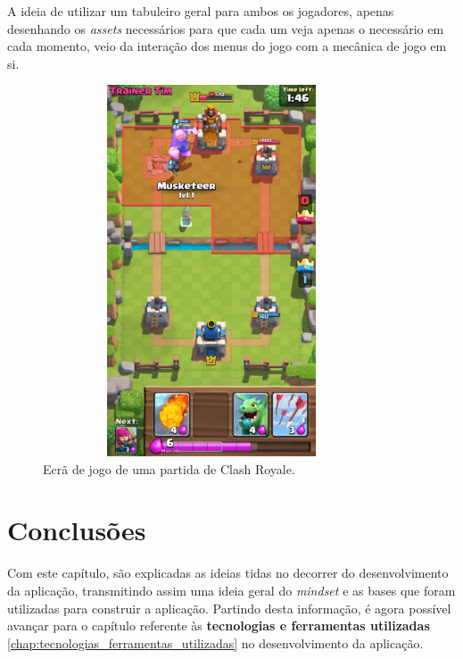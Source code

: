 \begin{enumerate}
    A ideia de utilizar um tabuleiro geral para ambos os jogadores, apenas desenhando os \textit{assets} necessários para que cada um veja apenas o necessário em cada momento, veio da interação dos menus do jogo com a mecânica de jogo em si.

\begin{figure}[!h]
  \includegraphics[width=10cm, height=11cm]{clash-royale-4.jpg}
  \centering
  \caption{Ecrã de jogo de uma partida de Clash Royale.}
  \label{fig:clash}
\end{figure}

\end{enumerate}



\clearpage
\section{Conclusões}
\label{chap2:sec:conc}
Com este capítulo, são explicadas as ideias tidas no decorrer do desenvolvimento da aplicação, transmitindo assim uma ideia geral do \textit{mindset} e as bases que foram utilizadas para construir a aplicação. Partindo desta informação, é agora possível avançar para o capítulo referente às \textbf{tecnologias e ferramentas utilizadas} \autoref{chap:tecnologias_ferramentas_utilizadas} no desenvolvimento da aplicação.